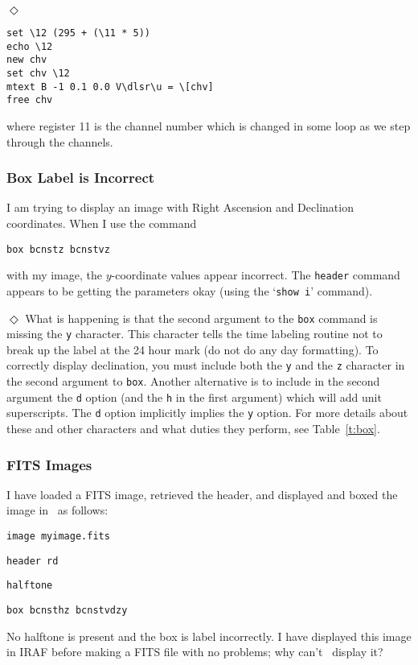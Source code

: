 \indent$\Diamond$
\begin{verbatim}
set \12 (295 + (\11 * 5))
echo \12
new chv
set chv \12
mtext B -1 0.1 0.0 V\dlsr\u = \[chv]
free chv
\end{verbatim}
where register 11 is the channel number which is changed
in some loop as we step through the channels.


\subsubsection*         {Box Label is Incorrect}

I am trying to display an image with Right Ascension and
Declination coordinates.  When I use the command
\begin{wiplist}%
  \item {\tt box bcnstz bcnstvz}
\end{wiplist}
with my image,
the $y$-coordinate values appear incorrect.
The {\tt header} command appears to be 
getting the parameters okay
(using the `{\tt show i}' command).

\indent$\Diamond$
What is happening is that the second argument to the {\tt box} command
is missing the {\tt y} character.
This character tells the time labeling routine not to break up the label
at the 24 hour mark (\ie do not do any day formatting).
To correctly display declination, you must include both the {\tt y} and
the {\tt z} character in the second argument to {\tt box}.
Another alternative is to include in the second argument the {\tt d} option
(and the {\tt h} in the first argument)
which will add unit superscripts.
The {\tt d} option implicitly implies the {\tt y} option.
For more details about these and other characters and what duties they perform,
see Table~\ref{t:box}.

\subsubsection*         {FITS Images}

I have loaded a FITS image,
retrieved the header, and displayed and boxed the image in \wip\ as follows:
\begin{wiplist}%
  \item {\tt image myimage.fits}
\samepage
  \item {\tt header rd}
  \item {\tt halftone}
  \item {\tt box bcnsthz bcnstvdzy}
\end{wiplist}
No halftone is present and the box is label incorrectly.
I have displayed this image in IRAF before making a FITS file
with no problems; why can't \wip\ display it?

